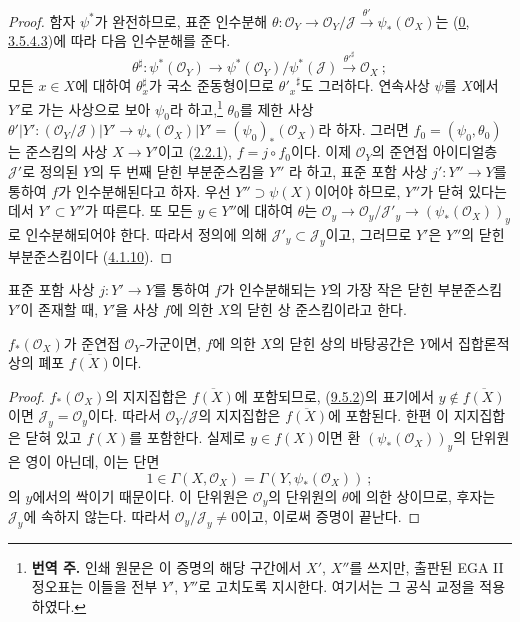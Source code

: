 \begin{proof}
함자 $\psi^*$가 완전하므로, 표준 인수분해
$\theta:\mathscr{O}_Y\to\mathscr{O}_Y/\mathscr{J}
\xrightarrow{\theta'}\psi_*(\mathscr{O}_X)$는
(\hyperref[0.3.5.4.3-ko]{0, 3.5.4.3})에 따라 다음 인수분해를 준다.
\[
  \theta^\sharp:\psi^*(\mathscr{O}_Y)
  \to\psi^*(\mathscr{O}_Y)/\psi^*(\mathscr{J})
  \xrightarrow{{\theta'}^\sharp}\mathscr{O}_X~;
\]
모든 $x\in X$에 대하여 $\theta_x^\sharp$가 국소 준동형이므로
${\theta'_x}^\sharp$도 그러하다. 연속사상 $\psi$를 $X$에서
$Y'$로 가는 사상으로 보아 $\psi_0$라 하고,\footnote{\textbf{번역 주.}
인쇄 원문은 이 증명의 해당 구간에서
$X'$, $X''$를 쓰지만, 출판된 EGA II 정오표는 이들을 전부
$Y'$, $Y''$로 고치도록 지시한다. 여기서는 그 공식 교정을
적용하였다.}
$\theta_0$를 제한 사상
$\theta'|Y':(\mathscr{O}_Y/\mathscr{J})|Y'
\to\psi_*(\mathscr{O}_X)|Y'=(\psi_0)_*(\mathscr{O}_X)$라 하자.
그러면 $f_0=(\psi_0,\theta_0)$는 준스킴의 사상 $X\to Y'$이고
(\hyperref[I.2.2.1-ko]{2.2.1}), $f=j\circ f_0$이다. 이제
$\mathscr{O}_Y$의 준연접 아이디얼층 $\mathscr{J}'$로 정의된
$Y$의 두 번째 닫힌 부분준스킴을 $Y''$
라 하고, 표준 포함 사상 $j':Y''\to Y$를 통하여 $f$가
인수분해된다고 하자. 우선 $Y''\supset\psi(X)$이어야 하므로,
$Y''$가 닫혀 있다는 데서 $Y'\subset Y''$가 따른다. 또 모든
$y\in Y''$에 대하여 $\theta$는
$\mathscr{O}_y\to\mathscr{O}_y/\mathscr{J}'_y
\to(\psi_*(\mathscr{O}_X))_y$로 인수분해되어야 한다.
따라서 정의에 의해 $\mathscr{J}'_y\subset\mathscr{J}_y$이고,
그러므로 $Y'$은 $Y''$의 닫힌 부분준스킴이다
(\hyperref[I.4.1.10-ko]{4.1.10}).
\end{proof}

\begin{definition}[9.5.3]
\label{I.9.5.3-ko}
표준 포함 사상 $j:Y'\to Y$를 통하여 $f$가 인수분해되는 $Y$의
가장 작은 닫힌 부분준스킴 $Y'$이 존재할 때, $Y'$을 사상 $f$에
의한 $X$의 닫힌 상 준스킴이라고 한다.
\end{definition}

\begin{proposition}[9.5.4]
\label{I.9.5.4-ko}
$f_*(\mathscr{O}_X)$가 준연접 $\mathscr{O}_Y$-가군이면, $f$에 의한
$X$의 닫힌 상의 바탕공간은 $Y$에서 집합론적 상의 폐포
$\overline{f(X)}$이다.
\end{proposition}

\begin{proof}
$f_*(\mathscr{O}_X)$의 지지집합은 $\overline{f(X)}$에 포함되므로,
(\hyperref[I.9.5.2-ko]{9.5.2})의 표기에서
$y\notin\overline{f(X)}$이면 $\mathscr{J}_y=\mathscr{O}_y$이다.
따라서 $\mathscr{O}_Y/\mathscr{J}$의 지지집합은
$\overline{f(X)}$에 포함된다. 한편 이 지지집합은 닫혀 있고
$f(X)$를 포함한다. 실제로 $y\in f(X)$이면 환
$(\psi_*(\mathscr{O}_X))_y$의 단위원은 영이 아닌데, 이는 단면
\[
  1\in\Gamma(X,\mathscr{O}_X)=\Gamma(Y,\psi_*(\mathscr{O}_X))~;
\]
의 $y$에서의 싹이기 때문이다. 이 단위원은 $\mathscr{O}_y$의
단위원의 $\theta$에 의한 상이므로, 후자는 $\mathscr{J}_y$에 속하지
않는다. 따라서 $\mathscr{O}_y/\mathscr{J}_y\neq0$이고, 이로써 증명이
끝난다.
\end{proof}

